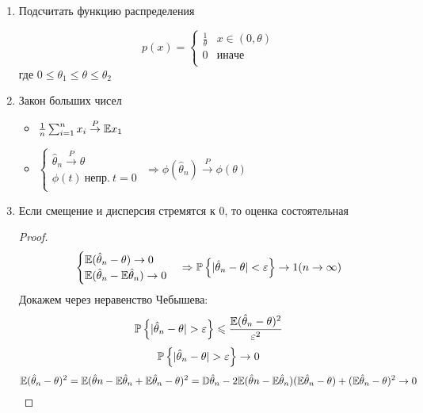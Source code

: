 \begin{enumerate}%
	\item Подсчитать функцию распределения
	\begin{example}
	$$ p(x) = \begin{cases}
	\frac{1}{\theta} & x\in(0, \theta) \\
	0 & иначе \\
	\end{cases} $$
	где $0 \leq \theta_1 \leq \theta \leq \theta_2$ \\
	\end{example}
	\item Закон больших чисел
	\begin{itemize}
		\item $\frac{1}{n}\sum_{i=1}^n x_i \overset{P}{\to} \mathbb{E}x_1$
		\item $\begin{cases}
			\hat{\theta}_n \overset{P}{\to} \theta \\
			\phi(t) \ непр. \ t=0 \\
		\end{cases}$ $\Rightarrow \phi(\hat{\theta}_n) \overset{P}{\to} \phi(\theta) $
	\end{itemize}

	\item Если смещение и дисперсия стремятся к 0, то оценка состоятельная \\
	\begin{proof} \\
	$$ \begin{cases}
			\mathbb{E}(\hat{\theta}_n - \theta) \to 0 \\
			\mathbb{E}(\hat{\theta}_n - \mathbb{E}\hat{\theta}_n) \to 0 \\
		\end{cases} \Rightarrow \mathbb{P}\left\{ |\hat{\theta}_n - \theta| < \varepsilon \right\} \to 1 (n \to \infty) $$ 
		Докажем через неравенство Чебышева:
		$$ \mathbb{P}\left\{ |\hat{\theta}_n - \theta| > \varepsilon \right\} \leqslant \frac{\mathbb{E}(\hat{\theta}_n - \theta)^2}{\varepsilon^2}$$
		$$  \mathbb{P} \left\{ |\hat{\theta}_n - \theta| > \varepsilon \right\} \to 0$$
		$$ \mathbb{E}(\hat{\theta}_n - \theta)^2 = \mathbb{E}(\hat{\theta}n - \mathbb{E}\hat{\theta}_n + \mathbb{E}\hat{\theta}_n - \theta)^2 = \mathbb{D}\hat{\theta}_n - 2 \mathbb{E}(\hat{\theta}n - \mathbb{E}\hat{\theta}_n)(\mathbb{E}\hat{\theta}_n - \theta) + (\mathbb{E}\hat{\theta}_n - \theta)^2 \to 0 $$
	\end{proof}
\end{enumerate}

